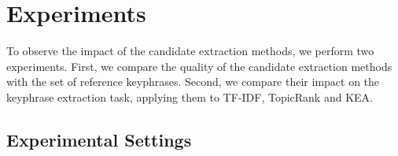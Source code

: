 \section{Experiments}
\label{sec:evaluation}
  To observe the impact of the candidate extraction methods, we perform two
  experiments. First, we compare the quality of the candidate extraction methods
  with the set of reference keyphrases. Second, we compare their impact on the
  keyphrase extraction task, applying them to TF-IDF, TopicRank and KEA.

  \subsection{Experimental Settings}
  \label{subsec:evaluation_settings}


